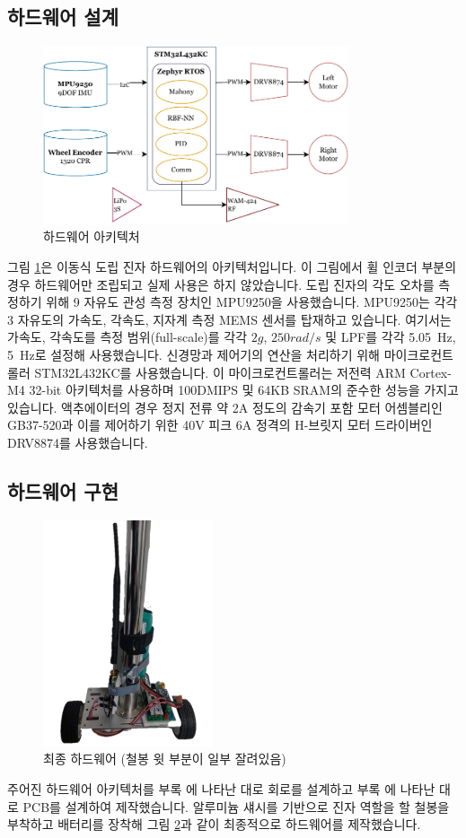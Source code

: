 \subsection{하드웨어 설계}
%
\begin{figure}[h]
    \centering
    \includegraphics[width=9cm]{figures/hw_arch.pdf}
    \caption{하드웨어 아키텍처}
    \label{fig:hardware_arch}
\end{figure}
%
그림 \ref{fig:hardware_arch}은 이동식 도립 진자 하드웨어의 아키텍처입니다. 이 그림에서 휠 인코더 부분의 경우 하드웨어만 조립되고 실제 사용은 하지 않았습니다. 도립 진자의 각도 오차를 측정하기 위해 9 자유도 관성 측정 장치인 MPU9250을 사용했습니다. MPU9250는 각각 3 자유도의 가속도, 각속도, 지자계 측정 MEMS 센서를 탑재하고 있습니다. \cite{invensense:mpu9250} 여기서는 가속도, 각속도를 측정 범위(full-scale)를 각각 \(2g\), \(250rad/s\) 및 LPF를 각각 \SI{5.05}{\Hz}, \SI{5}{\Hz}로 설정해 사용했습니다. 신경망과 제어기의 연산을 처리하기 위해 마이크로컨트롤러 STM32L432KC를 사용했습니다. 이 마이크로컨트롤러는 저전력 ARM Cortex-M4 32-bit 아키텍처를 사용하며 100DMIPS 및 64KB SRAM의 준수한 성능을 가지고 있습니다. \cite{st:stm32l432kc} 액추에이터의 경우 정지 전류 약 2A 정도의 감속기 포함 모터 어셈블리인 GB37-520과 이를 제어하기 위한 40V 피크 6A 정격의 H-브릿지 모터 드라이버인 DRV8874를 사용했습니다. \cite{ti:drv8847}
%
\subsection{하드웨어 구현}
%
\begin{figure}[H]
    \centering
    \includegraphics[width=5cm]{figures/hw.png}
    \caption{최종 하드웨어 (철봉 윗 부분이 일부 잘려있음)}
    \label{fig:hardware}
\end{figure}
%
주어진 하드웨어 아키텍처를 부록 에 나타난 대로 회로를 설계하고 부록 에 나타난 대로 PCB를 설계하여 제작했습니다. 알루미늄 섀시를 기반으로 진자 역할을 할 철봉을 부착하고 배터리를 장착해 그림 \ref{fig:hardware}과 같이 최종적으로 하드웨어를 제작했습니다.
%
